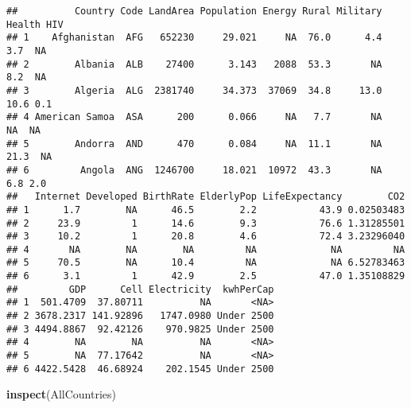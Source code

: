 \documentclass[]{book}
\newenvironment{Shaded}{\begin{snugshade}}{\end{snugshade}}
\newcommand{\KeywordTok}[1]{\textcolor[rgb]{0.13,0.29,0.53}{\textbf{#1}}}
\newcommand{\NormalTok}[1]{#1}
\begin{document}
\begin{verbatim}
##          Country Code LandArea Population Energy Rural Military Health HIV
## 1    Afghanistan  AFG   652230     29.021     NA  76.0      4.4    3.7  NA
## 2        Albania  ALB    27400      3.143   2088  53.3       NA    8.2  NA
## 3        Algeria  ALG  2381740     34.373  37069  34.8     13.0   10.6 0.1
## 4 American Samoa  ASA      200      0.066     NA   7.7       NA     NA  NA
## 5        Andorra  AND      470      0.084     NA  11.1       NA   21.3  NA
## 6         Angola  ANG  1246700     18.021  10972  43.3       NA    6.8 2.0
##   Internet Developed BirthRate ElderlyPop LifeExpectancy        CO2
## 1      1.7        NA      46.5        2.2           43.9 0.02503483
## 2     23.9         1      14.6        9.3           76.6 1.31285501
## 3     10.2         1      20.8        4.6           72.4 3.23296040
## 4       NA        NA        NA         NA             NA         NA
## 5     70.5        NA      10.4         NA             NA 6.52783463
## 6      3.1         1      42.9        2.5           47.0 1.35108829
##         GDP      Cell Electricity  kwhPerCap
## 1  501.4709  37.80711          NA       <NA>
## 2 3678.2317 141.92896   1747.0980 Under 2500
## 3 4494.8867  92.42126    970.9825 Under 2500
## 4        NA        NA          NA       <NA>
## 5        NA  77.17642          NA       <NA>
## 6 4422.5428  46.68924    202.1545 Under 2500
\end{verbatim}

\begin{Shaded}
\begin{Highlighting}[]
\KeywordTok{inspect}\NormalTok{(AllCountries)}
\end{Highlighting}
\end{Shaded}
\end{document}
